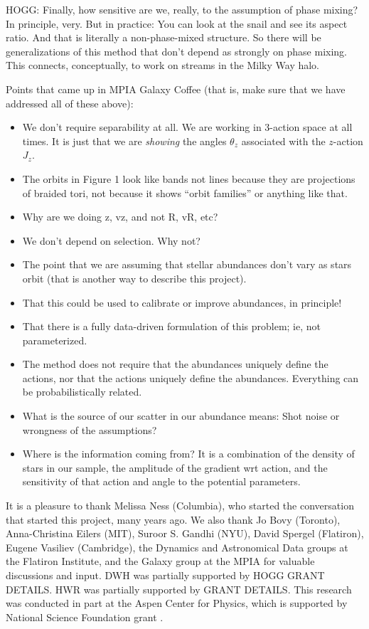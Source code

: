 \documentclass[modern]{aastex63}
\begin{document}
HOGG: Finally, how sensitive are we, really, to the assumption of
phase mixing? In principle, very. But in practice: You can look at the
snail and see its aspect ratio. And that is literally a
non-phase-mixed structure. So there will be generalizations of this
method that don't depend as strongly on phase mixing. This connects,
conceptually, to work on streams in the Milky Way halo.

Points that came up in MPIA Galaxy Coffee (that is, make sure that we
have addressed all of these above):
\begin{itemize}
\item
  We don't require separability at all. We are working in 3-action
  space at all times. It is just that we are \emph{showing} the angles
  $\theta_z$ associated with the $z$-action $J_z$.
\item
  The orbits in Figure 1 look like bands not lines because they are
  projections of braided tori, not because it shows ``orbit families''
  or anything like that.
\item
  Why are we doing z, vz, and not R, vR, etc?
\item
  We don't depend on selection. Why not?
\item
  The point that we are assuming that stellar abundances don't vary as
  stars orbit (that is another way to describe this project).
\item
  That this could be used to calibrate or improve abundances, in
  principle!
\item
  That there is a fully data-driven formulation of this problem; ie, not
  parameterized.
\item
  The method does not require that the abundances uniquely define the
  actions, nor that the actions uniquely define the
  abundances. Everything can be probabilistically related.
\item
  What is the source of our scatter in our abundance means: Shot noise
  or wrongness of the assumptions?
\item
  Where is the information coming from? It is a combination of the
  density of stars in our sample, the amplitude of the gradient wrt
  action, and the sensitivity of that action and angle to the potential
  parameters.
\end{itemize}

\acknowledgments
It is a pleasure to thank
  Melissa Ness (Columbia),
  who started the conversation that started this project, many years ago.
We also thank
  Jo Bovy (Toronto),
  Anna-Christina Eilers (MIT),
  Suroor S. Gandhi (NYU),
  David Spergel (Flatiron),
  Eugene Vasiliev (Cambridge),
  the Dynamics and Astronomical Data groups at the Flatiron Institute,
  and the Galaxy group at the MPIA
for valuable discussions and input.
DWH was partially supported by HOGG GRANT DETAILS.
HWR was partially supported by GRANT DETAILS.
This research was conducted in part at the Aspen Center for Physics,
which is supported by National Science Foundation grant .
\end{document}
